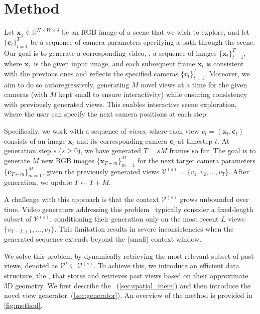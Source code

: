 \section{Method}%
\label{sec:method}

Let $\mathbf{x}_1 \in \mathbb{R}^{H\times W\times 3}$ be an RGB image of a scene that we wish to explore, and let $\{\mathbf{c}_t\}_{t=1}^T$ be a sequence of camera parameters specifying a path through the scene.
Our goal is to generate a corresponding video, \ie, a sequence of images $\{\mathbf{x}_t\}_{t=1}^T$, where $\mathbf{x}_1$ is the given input image, and each subsequent frame $\mathbf{x}_t$ is consistent with the previous ones and reflects the specified cameras $\{\mathbf{c}_t\}_{t=1}^T$.
Moreover, we aim to do so autoregressively, generating $M$ novel views at a time for the given cameras (with $M$ kept small to ensure interactivity) while ensuring consistency with previously generated views.
This enables interactive scene exploration, where the user can specify the next camera positions at each step.

Specifically, we work with a sequence of \textit{views}, where each view $v_t = (\mathbf{x}_t, \mathbf{c}_t)$ consists of an image $\mathbf{x}_t$ and its corresponding camera $\mathbf{c}_t$ at timestep $t$.
At generation step $s$ ($s\geq 0$), we have generated $T = sM$ frames so far.
The goal is to generate $M$ new RGB images $\{\mathbf{x}_{T+m}\}_{m=1}^M$ for the next target camera parameters $\{\mathbf{c}_{T+m}\}_{m=1}^M$, given the previously generated views $\mathcal{V}^{(s)} = \{v_1, v_2, \dots, v_T\}$.
After generation, we update $T \leftarrow T + M$.

A challenge with this approach is that the context $\mathcal{V}^{(s)}$ grows unbounded over time.
Video generators addressing this problem~\cite{geogpt, photometricnvs, ren2022look, wang2024motionctrl} typically consider a fixed-length subset of $\mathcal{V}^{(s)}$, conditioning their generation only on the most recent $L$ views $\{v_{T-L+1}, \dots, v_T\}$.
This limitation results in severe inconsistencies when the generated sequence extends beyond the (small) context window.

We solve this problem by dynamically retrieving the most relevant subset of past views, denoted as $\mathcal{V}^* \subseteq \mathcal{V}^{(s)}$.
To achieve this, we introduce an efficient data structure, the \mnamel, that stores and retrieves past views based on their approximate 3D geometry.
We first describe the \mnamel~(\cref{sec:spatial_mem}) and then introduce the novel view generator~(\cref{sec:generator}).
An overview of the method is provided in \cref{fig:method}.

